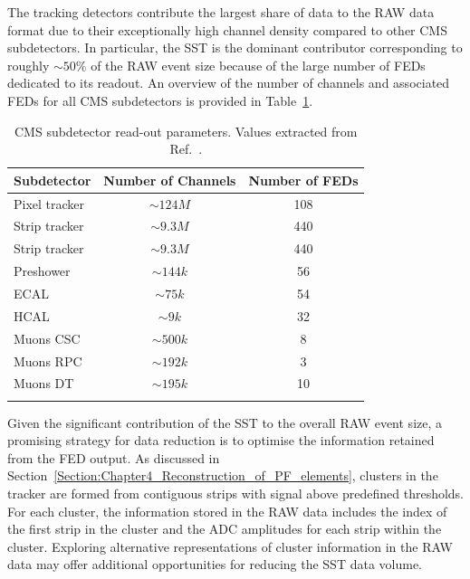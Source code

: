 The tracking detectors contribute the largest share of data to the RAW data format due to their exceptionally high channel density compared to other CMS subdetectors. In particular, the SST is the dominant contributor corresponding to roughly $\sim 50\%$ of the RAW event size because of the large number of FEDs dedicated to its readout. An overview of the number of channels and associated FEDs for all CMS subdetectors is provided in Table~\ref{Table:Chapter4_RAW_Channels_FED}.

\begin{table}[htbp]
\centering
\renewcommand{\arraystretch}{1.5} %
\begin{tabular}{|l|c|c|}
\hline
Subdetector & Number of Channels & Number of FEDs \\
\hline \hline
Pixel tracker & $\sim124\unit{M}$ & 108 \\
\arrayrulecolor{lightgray} \hline
Strip tracker & $\sim9.3\unit{M}$ & 440 \\
\arrayrulecolor{lightgray} \hline
Strip tracker & $\sim9.3\unit{M}$ & 440 \\
\arrayrulecolor{lightgray} \hline
Preshower & $\sim144\unit{k}$ & 56 \\
\arrayrulecolor{lightgray} \hline
ECAL & $\sim75\unit{k}$ & 54 \\
\arrayrulecolor{lightgray} \hline
HCAL & $\sim9\unit{k}$ & 32 \\
\arrayrulecolor{lightgray} \hline
Muons CSC & $\sim500\unit{k}$ & 8 \\
\arrayrulecolor{lightgray} \hline
Muons RPC & $\sim192\unit{k}$ & 3 \\
\arrayrulecolor{lightgray} \hline
Muons DT & $\sim195\unit{k}$ & 10 \\
\arrayrulecolor{lightgray} \hline
\arrayrulecolor{black} \hline
\end{tabular}
\caption[CMS subdetector read-out parameters]{CMS subdetector read-out parameters. Values extracted from Ref.~\cite{LHC_CMS,CMS_Tracker_Phase1_Upgrade_2}.}
\label{Table:Chapter4_RAW_Channels_FED}
\end{table}

Given the significant contribution of the SST to the overall RAW event size, a promising strategy for data reduction is to optimise the information retained from the FED output. As discussed in Section~\ref{Section:Chapter4_Reconstruction_of_PF_elements}, clusters in the tracker are formed from contiguous strips with signal above predefined thresholds. For each cluster, the information stored in the RAW data includes the index of the first strip in the cluster and the ADC amplitudes for each strip within the cluster. Exploring alternative representations of cluster information in the RAW data may offer additional opportunities for reducing the SST data volume.

